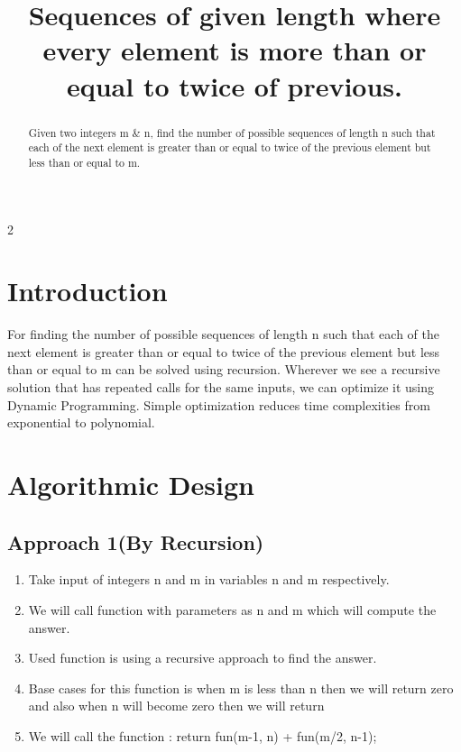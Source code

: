 2\documentclass[conference]{IEEEtran}
\begin{document}
\title{ Sequences of given length where every element is more than or equal to twice of previous.\\
}
\author{
\and
{}
\and
{}
}

\maketitle

\begin{abstract}
Given two integers m & n, find the number of possible sequences of length n such that each of the next element is greater than or equal to twice of the previous element but less than or equal to m.\end{abstract}

\section{Introduction}
For finding the number of possible sequences of length n such that each of the next element is greater than or equal to twice of the previous element but less than or equal to m can be solved using recursion. Wherever we see a recursive solution that has repeated calls for the same inputs, we can optimize it using Dynamic Programming. Simple optimization reduces time complexities from exponential to polynomial.
\section{Algorithmic Design}

\subsection{ \textbf{Approach  1(By Recursion)}}
\begin{enumerate}
\item Take input of integers n and m in variables n and m respectively.
\item We will call function with parameters as n and m which will compute the answer.
\item Used function is using a recursive approach to find the answer.
\item  Base cases for this function is when m is less than n then we will return zero and also when n will become zero then we will return
\item We will call the function : return fun(m-1, n) + fun(m/2, n-1); 
\end{enumerate}
\end{document}
